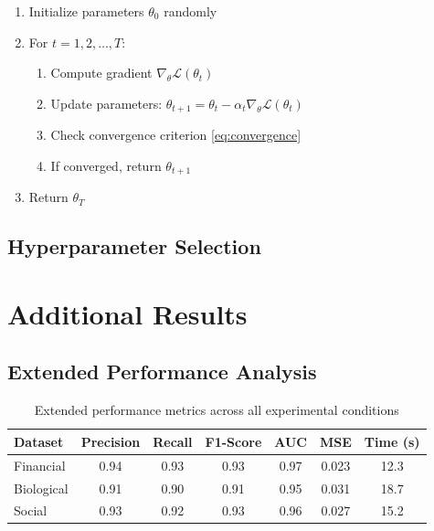 \documentclass[12pt, letterpaper, onecolumn, final]{article}
\theoremstyle{plain}
\theoremstyle{definition}
\theoremstyle{remark}
\begin{document}
\begin{enumerate}
    \item Initialize parameters $\theta_0$ randomly
    \item For $t = 1, 2, \ldots, T$:
    \begin{enumerate}
        \item Compute gradient $\nabla_\theta \mathcal{L}(\theta_t)$
        \item Update parameters: $\theta_{t+1} = \theta_t - \alpha_t \nabla_\theta \mathcal{L}(\theta_t)$
        \item Check convergence criterion \cref{eq:convergence}
        \item If converged, return $\theta_{t+1}$
    \end{enumerate}
    \item Return $\theta_T$
\end{enumerate}

\lipsum[59]

\subsection{Hyperparameter Selection}
\label{app:hyperparams}

\lipsum[60]

\section{Additional Results}
\label{app:results}

\lipsum[61-62]

\subsection{Extended Performance Analysis}
\label{app:extended-performance}

\lipsum[63]

\begin{table}[htbp]
    \centering
    \caption{Extended performance metrics across all experimental conditions}
    \label{tab:extended-performance}
    \begin{tabular}{lcccccc}
        \toprule
        Dataset & Precision & Recall & F1-Score & AUC & MSE & Time (s) \\
        \midrule
        Financial & 0.94 & 0.93 & 0.93 & 0.97 & 0.023 & 12.3 \\
        Biological & 0.91 & 0.90 & 0.91 & 0.95 & 0.031 & 18.7 \\
        Social & 0.93 & 0.92 & 0.93 & 0.96 & 0.027 & 15.2 \\
        \bottomrule
    \end{tabular}
\end{table}
\end{document}
